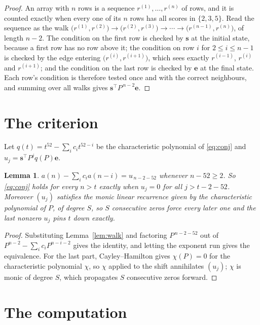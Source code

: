 \documentclass[11pt,a4paper]{article}
\theoremstyle{plain}
\newtheorem{lemma}[theorem]{Lemma}
\theoremstyle{definition}
\begin{document}
\begin{proof}
An array with $n$ rows is a sequence $r^{(1)},\dots,r^{(n)}$ of rows, and it is counted
exactly when every one of its $n$ rows has all scores in $\{2,3,5\}$. Read the sequence as the
walk $\bigl(r^{(1)},r^{(2)}\bigr)\to\bigl(r^{(2)},r^{(3)}\bigr)\to\cdots\to
\bigl(r^{(n-1)},r^{(n)}\bigr)$, of length $n-2$. The condition on the first row is
checked by $\mathbf{s}$ at the initial state, because a first row has no row above it; the
condition on row $i$ for $2\le i\le n-1$ is checked by the edge entering
$\bigl(r^{(i)},r^{(i+1)}\bigr)$, which sees exactly $r^{(i-1)}$, $r^{(i)}$ and
$r^{(i+1)}$; and the condition on the last row is checked by $\mathbf{e}$ at the final
state. Each row's condition is therefore tested once and with the correct neighbours, and
summing over all walks gives $\mathbf{s}^{\!\top}P^{\,n-2}\mathbf{e}$.
\end{proof}

\section{The criterion}

Let $q(t)=t^{52}-\sum_i c_i t^{52-i}$ be the characteristic polynomial of
\eqref{eq:conj} and $u_j=\mathbf{s}^{\!\top}P^{j}q(P)\mathbf{e}$.

\begin{lemma}\label{lem:crit}
$a(n)-\sum_i c_i a(n-i)=u_{\,n-2-52}$ whenever $n-52\ge2$. So \eqref{eq:conj}
holds for every $n>t$ exactly when $u_j=0$ for all $j>t-2-52$. Moreover $(u_j)$
satisfies the monic linear recurrence given by the characteristic polynomial of $P$, of
degree $S$, so $S$ consecutive zeros force every later one and the last nonzero $u_j$ pins
$t$ down exactly.
\end{lemma}

\begin{proof}
Substituting Lemma~\ref{lem:walk} and factoring $P^{\,n-2-52}$ out of
$P^{n-2}-\sum_i c_i P^{n-i-2}$ gives the identity, and letting the exponent run gives the
equivalence. For the last part, Cayley--Hamilton gives $\chi(P)=0$ for the characteristic
polynomial $\chi$, so $\chi$ applied to the shift annihilates $(u_j)$; $\chi$ is monic of
degree $S$, which propagates $S$ consecutive zeros forward.
\end{proof}

\section{The computation}
\end{document}
